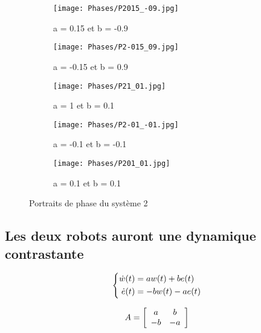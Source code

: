 \documentclass[utf8]{article}
\begin{document}
\begin{figure}[!htb]
\centering
\begin{subfigure}{.5\textwidth}
  \centering
  \texttt{[image: Phases/P2015\_-09.jpg]}
  \caption{a = 0.15 et b = -0.9}
  \label{fig:sub1}
\end{subfigure}%
\begin{subfigure}{.5\textwidth}
  \centering
  \texttt{[image: Phases/P2-015\_09.jpg]}
  \caption{a = -0.15 et b = 0.9}
  \label{fig:sub2}
\end{subfigure}%
\begin{subfigure}{.5\textwidth}
  \centering
  \texttt{[image: Phases/P21\_01.jpg]}
  \caption{a = 1 et b = 0.1}
  \label{fig:sub2}
  \end{subfigure}
\begin{subfigure}{.5\textwidth}
  \centering
  \texttt{[image: Phases/P2-01\_-01.jpg]}
  \caption{a = -0.1 et b = -0.1}
  \label{fig:sub2}
  \end{subfigure}
\begin{subfigure}{.5\textwidth}
  \centering
  \texttt{[image: Phases/P201\_01.jpg]}
  \caption{a = 0.1 et b = 0.1}
  \label{fig:sub2}
  \end{subfigure}
\caption{Portraits de phase du système 2}
\end{figure}

\newpage

\subsection{Les deux robots auront une dynamique contrastante}


\begin{equation}
\centering
\left\{\begin{split}
\dot{w}(t) &= aw(t) + be(t)\\
\dot{e}(t) &= - bw(t) - ae(t) \\
\end{split}\right.
 \end{equation}

\begin{equation}
\centering
A = \left[
\begin{array}{cc}
a & b\\
-b & -a
\end{array}
\right]
 \end{equation}
\end{document}
